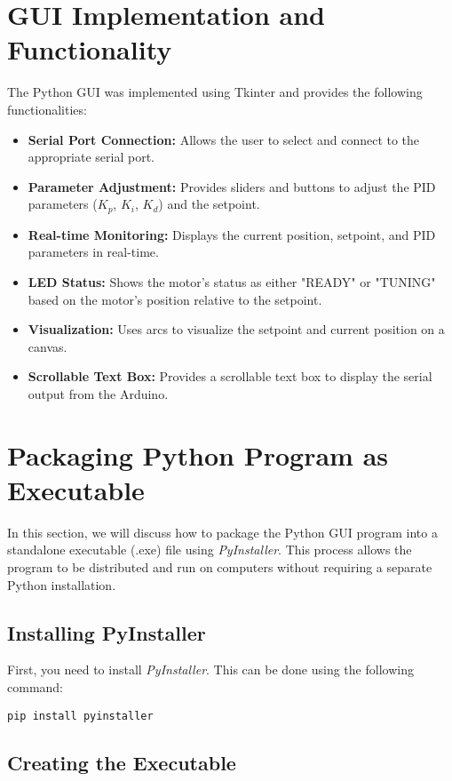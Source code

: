 \documentclass{article}
\begin{document}
\section{GUI Implementation and Functionality}
The Python GUI was implemented using Tkinter and provides the following functionalities:
\begin{itemize}
    \item \textbf{Serial Port Connection:} Allows the user to select and connect to the appropriate serial port.
    \item \textbf{Parameter Adjustment:} Provides sliders and buttons to adjust the PID parameters ($K_p$, $K_i$, $K_d$) and the setpoint.
    \item \textbf{Real-time Monitoring:} Displays the current position, setpoint, and PID parameters in real-time.
    \item \textbf{LED Status:} Shows the motor's status as either "READY" or "TUNING" based on the motor's position relative to the setpoint.
    \item \textbf{Visualization:} Uses arcs to visualize the setpoint and current position on a canvas.
    \item \textbf{Scrollable Text Box:} Provides a scrollable text box to display the serial output from the Arduino.
\end{itemize}

\section{Packaging Python Program as Executable}

In this section, we will discuss how to package the Python GUI program into a standalone executable (.exe) file using \textit{PyInstaller}. This process allows the program to be distributed and run on computers without requiring a separate Python installation.

\subsection{Installing PyInstaller}

First, you need to install \textit{PyInstaller}. This can be done using the following command:

\begin{verbatim}
pip install pyinstaller
\end{verbatim}

\subsection{Creating the Executable}
\end{document}
